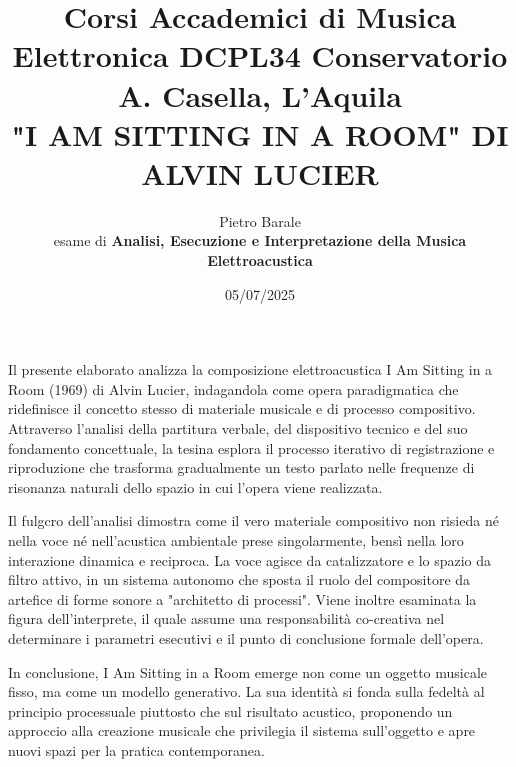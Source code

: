 \documentclass[a4paper,12pt]{article}
\title{Corsi Accademici di Musica Elettronica DCPL34 Conservatorio A. Casella, L'Aquila \\ \fontsize{14}{17}\bfseries\uppercase{"I am sitting in a room" di Alvin Lucier}}
\author{Pietro Barale \\ esame di \bfseries{Analisi, Esecuzione e Interpretazione della Musica Elettroacustica}}
\date{05/07/2025}
\begin{document}
\maketitle
\thispagestyle{empty}

\begin{center}
    \vspace{1cm}
    \textbf{\fontsize{12}{15}\selectfont{Sommario}}
\end{center}

Il presente elaborato analizza la composizione elettroacustica I Am Sitting in a Room (1969) di Alvin Lucier, indagandola come opera paradigmatica che ridefinisce il concetto stesso di materiale musicale e di processo compositivo. Attraverso l'analisi della partitura verbale, del dispositivo tecnico e del suo fondamento concettuale, la tesina esplora il processo iterativo di registrazione e riproduzione che trasforma gradualmente un testo parlato nelle frequenze di risonanza naturali dello spazio in cui l'opera viene realizzata.

Il fulgcro dell'analisi dimostra come il vero materiale compositivo non risieda né nella voce né nell'acustica ambientale prese singolarmente, bensì nella loro interazione dinamica e reciproca. La voce agisce da catalizzatore e lo spazio da filtro attivo, in un sistema autonomo che sposta il ruolo del compositore da artefice di forme sonore a "architetto di processi". Viene inoltre esaminata la figura dell'interprete, il quale assume una responsabilità co-creativa nel determinare i parametri esecutivi e il punto di conclusione formale dell'opera.

In conclusione, I Am Sitting in a Room emerge non come un oggetto musicale fisso, ma come un modello generativo. La sua identità si fonda sulla fedeltà al principio processuale piuttosto che sul risultato acustico, proponendo un approccio alla creazione musicale che privilegia il sistema sull'oggetto e apre nuovi spazi per la pratica contemporanea.
\newpage
\tableofcontents  

\newpage



%
%
\end{document}
